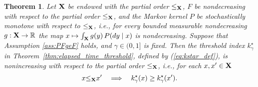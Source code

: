 \documentclass[letterpaper,10pt,conference]{ieeeconf}  %
\newtheorem{theorem}{Theorem}
\begin{document}
\medskip
\begin{theorem}
\label{thm:kstar_monotone_in_x}
{Let ${\bf X}$ be endowed with the partial order $\le_{\bf X}$}, {$F$} be nondecreasing with respect to the partial order {$\le_{\bf X}$}, and the Markov kernel $P$ be \emph{stochastically monotone} 
with respect to {$\le_{\bf X}$}, i.e., for every bounded measurable nondecreasing $g:{\bf X}\to\mathbb R$ the map
$x\mapsto \int_{\bf X} g(y)\,P(dy \mid x)$ is nondecreasing.  Suppose that
 {Assumption \ref{ass:PFgeF} holds}, and {$\gamma\in(0,1]$ is fixed}.  Then {the threshold index $k_\gamma^\star$ in Theorem~\ref{thm:elapsed_time_threshold}, defined by (\ref{eq:kstar_def}),} is nonincreasing with respect to the partial {order $\le_{\bf X}$}, i.e., {for each $x,x'\in {\bf X}$}
\[
x{\le_{\bf X}} x' \quad \Longrightarrow \quad {k^\star_\gamma}(x) \ge {k^\star_\gamma}(x').
\]
\end{theorem}
\medskip
\end{document}
